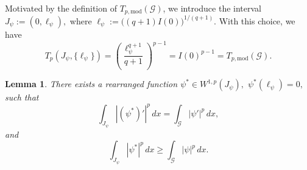 \documentclass[12pt,a4paper]{article}
\numberwithin{equation}{section}
\newtheorem{lemma}[theorem]{Lemma}
\begin{document}
	Motivated by the definition of $T_{p,\mathrm{mod}}(\mathcal{G})$, we introduce the
	interval
	\(
	J_\psi:=(0,\ell_\psi),\) where
	\(\ell_\psi:=\bigl((q+1)I(0)\bigr)^{1/(q+1)}.
	\)
	With this choice, we have
	\begin{equation}\label{eq:Modtor}
	T_p(J_\psi,\{\ell_\psi\})
=
\left(
\frac{\ell_\psi^{q+1}}{q+1}
\right)^{p-1}
=
I(0)^{p-1}
=
T_{p,\mathrm{mod}}(\mathcal{G}).
	\end{equation}

	\begin{lemma}
		\label{lem:KJrearrange}
		There exists a rearranged function
		\(
		\psi^*\in W^{1,p}(J_\psi),\) \(	\psi^*(\ell_\psi)=0,
		\)
		such that
		\begin{equation}
			\label{eq:KJrear1}
			\int_{J_\psi}|(\psi^*)'|^p\,dx
			=
			\int_{\mathcal G}|\psi'|^p\,dx,
		\end{equation}
		and
		\begin{equation}
			\label{eq:KJrear2}
			\int_{J_\psi}|\psi^*|^p\,dx
			\ge
			\int_{\mathcal G}|\psi|^p\,dx.
		\end{equation}
	\end{lemma}
\end{document}
